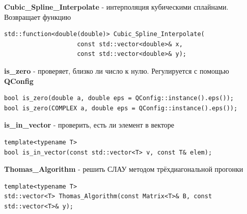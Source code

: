 \documentclass[12pt,fleqn]{article}
\begin{document}
\begin{center}{\textbf{Cubic\_Spline\_Interpolate} - интерполяция кубическими сплайнами. Возвращает функцию}\end{center}

\begin{mdframed}[linecolor=black, topline=true, bottomline=true,
    leftline=false, rightline=false]
\begin{verbatim}
std::function<double(double)> Cubic_Spline_Interpolate(
                    const std::vector<double>& x,
                    const std::vector<double>& y);
\end{verbatim}
\end{mdframed}

\begin{center}{\textbf{is\_zero} - проверяет, близко ли число к нулю. Регулируется с помощью \textbf{QConfig}}\end{center}
\begin{mdframed}[linecolor=black, topline=true, bottomline=true,
    leftline=false, rightline=false]
\begin{verbatim}
bool is_zero(double a, double eps = QConfig::instance().eps());
bool is_zero(COMPLEX a, double eps = QConfig::instance().eps());
\end{verbatim}
\end{mdframed}

\begin{center}{\textbf{is\_in\_vector} - проверить, есть ли элемент в векторе}\end{center}

\begin{mdframed}[linecolor=black, topline=true, bottomline=true,
    leftline=false, rightline=false]
\begin{verbatim}
template<typename T>
bool is_in_vector(const std::vector<T> v, const T& elem);
\end{verbatim}
\end{mdframed}

\begin{center}{\textbf{Thomas\_Algorithm} - решить СЛАУ методом трёхдиагональной прогонки}\end{center}

\begin{mdframed}[linecolor=black, topline=true, bottomline=true,
    leftline=false, rightline=false]
\begin{verbatim}
template<typename T>
std::vector<T> Thomas_Algorithm(const Matrix<T>& B, const std::vector<T>& y);
\end{verbatim}
\end{mdframed}
\end{document}
